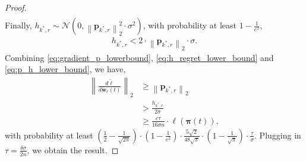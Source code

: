 \documentclass[10pt]{article}
\def\rvw{{\mathbf{w}}}
\def\rvp{{\mathbf{p}}}
\def\rvpi{{\boldsymbol{\pi}}}
\def\gN{{\mathcal{N}}}
\begin{document}
\begin{proof}
\begin{equation}
\begin{split}
\end{split}
\end{equation}
Finally, $h_{k^*,r} \sim \gN\left( 0, \left\| \rvp_{k^*, r} \right\|_2^2 \cdot \sigma^2 \right)$, with probability at least $1 - \frac{1}{e^2}$,
\begin{equation}
\label{eq:p_h_lower_bound}
\begin{split}
	h_{k^*,r} < 2 \cdot \left\| \rvp_{k^*, r} \right\|_2 \cdot \sigma.
\end{split}
\end{equation}
Combining \cref{eq:gradient_p_lowerbound}, \cref{eq:h_regret_lower_bound} and \cref{eq:p_h_lower_bound}, we have,
\begin{equation*}
\begin{split}
	\left\| \frac{d\tilde{\ell}}{d \rvw_r(t)} \right\|_2 &\ge \left\| \rvp_{k^*, r}\right\|_2 \\
	&> \frac{h_{k^*,r}}{2\sigma} \\
	&\ge \frac{c\tau}{16\sigma n} \cdot \ell(\rvpi(t)),
\end{split}
\end{equation*}
with probability at least $\left( \frac{1}{2} - \frac{1}{\sqrt{2\pi}} \right) \cdot \left( 1 - \frac{1}{e^2} \right) \cdot \frac{5\sqrt{2}}{48\sqrt{\pi}} \cdot \left( 1 - \frac{1}{\sqrt{\pi}} \right) \cdot \frac{\tau}{\sigma}$. Plugging in $\tau = \frac{\delta\sigma}{2n}$, we obtain the result.
\end{proof}
\end{document}
